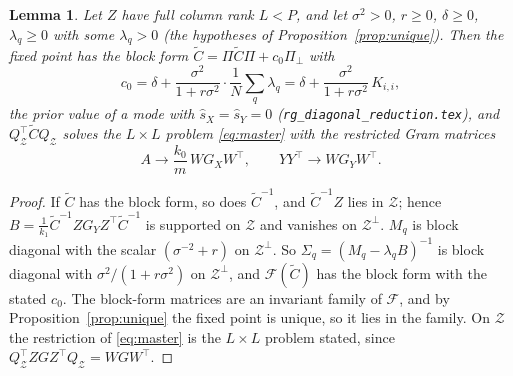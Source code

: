 \documentclass[11pt,a4paper]{article}
\newcommand{\Ct}{\tilde C}
\newcommand{\Z}{\mathcal Z}
\newtheorem{lemma}{Lemma}
\begin{document}
\begin{lemma}
Let $Z$ have full column rank $L < P$, and let $\sigma^2 > 0$, $r \ge 0$, $\delta \ge 0$, $\lambda_q \ge 0$ with some $\lambda_q > 0$ (the hypotheses of Proposition~\ref{prop:unique}). Then the fixed point has the block form $\Ct = \Pi\Ct\Pi + c_0\Pi_\perp$ with
\begin{equation}
  c_0 = \delta + \frac{\sigma^2}{1 + r\sigma^2}\cdot\frac1N\sum_q\lambda_q
      = \delta + \frac{\sigma^2}{1 + r\sigma^2}\,K_{i,i},
  \label{eq:c0}
\end{equation}
the prior value of a mode with $\hat s_X = \hat s_Y = 0$ (\texttt{rg\_diagonal\_reduction.tex}), and $Q_\Z^\top\Ct Q_\Z$ solves the $L\times L$ problem \eqref{eq:master} with the restricted Gram matrices
\begin{equation}
  A \to \frac{k_0}{m}\, W G_X W^\top, \qquad YY^\top \to W G_Y W^\top .
  \label{eq:restricted-gram}
\end{equation}
\end{lemma}
\begin{proof}
If $\Ct$ has the block form, so does $\Ct^{-1}$, and $\Ct^{-1}Z$ lies in $\Z$; hence $B = \frac1{k_1}\Ct^{-1}ZG_YZ^\top\Ct^{-1}$ is supported on $\Z$ and vanishes on $\Z^\perp$. $M_q$ is block diagonal with the scalar $(\sigma^{-2} + r)$ on $\Z^\perp$. So $\Sigma_q = (M_q - \lambda_q B)^{-1}$ is block diagonal with $\sigma^2/(1+r\sigma^2)$ on $\Z^\perp$, and $\mathcal F(\Ct)$ has the block form with the stated $c_0$. The block-form matrices are an invariant family of $\mathcal F$, and by Proposition~\ref{prop:unique} the fixed point is unique, so it lies in the family. On $\Z$ the restriction of \eqref{eq:master} is the $L\times L$ problem stated, since $Q_\Z^\top Z G Z^\top Q_\Z = W G W^\top$.
\end{proof}
\end{document}
